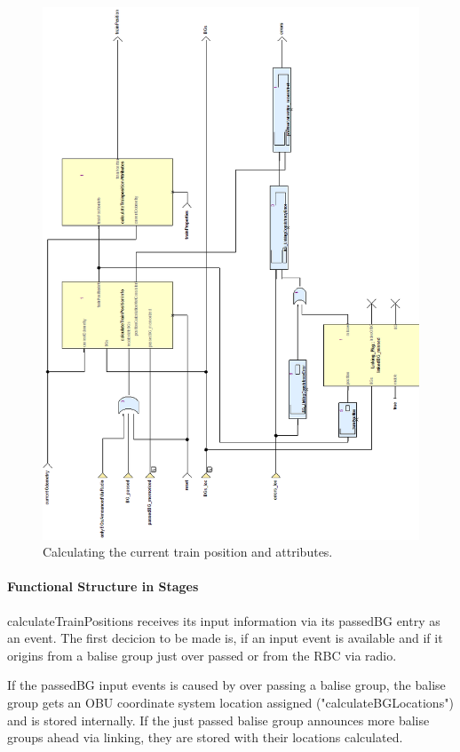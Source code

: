 \begin{figure}
\centering
\includegraphics[scale=0.5]{../images/calculateTrainPosition_decorations.png}
\caption{Calculating the current train position and attributes.}
\end{figure}


\paragraph{Functional Structure in Stages}
calculateTrainPositions receives its input information via its passedBG entry as an event. The first decicion to be made is, if an input event is available and if it origins from a balise group just over passed or from the RBC via radio. 

If the passedBG input events is caused by over passing a balise group, the balise group gets an OBU coordinate system location assigned ("calculateBGLocations") and is stored internally. If the just passed balise group announces more balise groups ahead via linking, they are stored with their locations calculated. 

